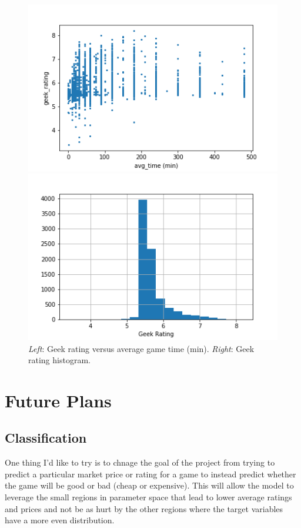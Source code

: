 \documentclass[12pt]{article}
\begin{document}
\begin{figure}[ht]
\centering
\begin{minipage}{.48\textwidth}
\centering
\includegraphics[width=\textwidth]{market_rating_avgtime.png}
\end{minipage} \hfill
\begin{minipage}{.48\textwidth}
\centering
\includegraphics[width=\textwidth]{market_rating_hist.png}
\end{minipage}
\caption{\small \textit{Left}: Geek rating versus average game time (min). \textit{Right}: Geek rating histogram.}
\end{figure}

\section{Future Plans}
\subsection{Classification}
One thing I'd like to try is to chnage the goal of the project from trying to predict a particular market price or rating for a game to instead predict whether the game will be good or bad (cheap or expensive). This will allow the model to leverage the small regions in parameter space that lead to lower average ratings and prices and not be as hurt by the other regions where the target variables have a more even distribution.
\end{document}

